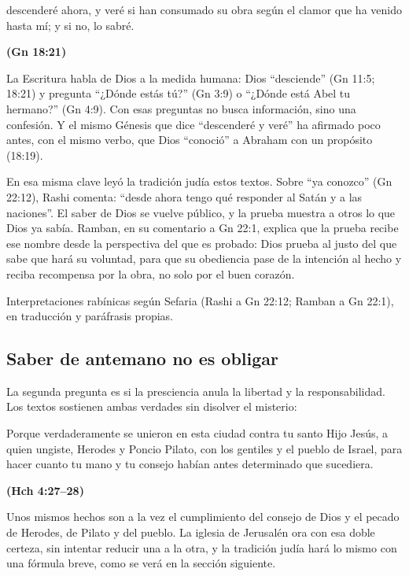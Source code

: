 \documentclass[11pt,letterpaper]{article}
\newcommand{\fuente}[1]{\par\hfill{\upshape\bfseries\small\textcolor{azul}{#1}}}
\begin{document}
\begin{cita}descenderé ahora, y veré si han consumado su obra según el clamor que ha venido hasta mí; y si no, lo sabré.\fuente{(Gn 18:21)}\end{cita}

La Escritura habla de Dios a la medida humana: Dios ``desciende'' (Gn 11:5; 18:21) y pregunta ``¿Dónde estás tú?'' (Gn 3:9) o ``¿Dónde está Abel tu hermano?'' (Gn 4:9). Con esas preguntas no busca información, sino una confesión. Y el mismo Génesis que dice ``descenderé y veré'' ha afirmado poco antes, con el mismo verbo, que Dios ``conoció'' a Abraham con un propósito (18:19).

En esa misma clave leyó la tradición judía estos textos. Sobre ``ya conozco'' (Gn 22:12), Rashi comenta: ``desde ahora tengo qué responder al Satán y a las naciones''. El saber de Dios se vuelve público, y la prueba muestra a otros lo que Dios ya sabía. Ramban, en su comentario a Gn 22:1, explica que la prueba recibe ese nombre desde la perspectiva del que es probado: Dios prueba al justo del que sabe que hará su voluntad, para que su obediencia pase de la intención al hecho y reciba recompensa por la obra, no solo por el buen corazón.

\begin{nota}[Precisión]
Interpretaciones rabínicas según Sefaria (Rashi a Gn 22:12; Ramban a Gn 22:1), en traducción y paráfrasis propias.
\end{nota}

\subsection{Saber de antemano no es obligar}
La segunda pregunta es si la presciencia anula la libertad y la responsabilidad. Los textos sostienen ambas verdades sin disolver el misterio:

\begin{cita}Porque verdaderamente se unieron en esta ciudad contra tu santo Hijo Jesús, a quien ungiste, Herodes y Poncio Pilato, con los gentiles y el pueblo de Israel, para hacer cuanto tu mano y tu consejo habían antes determinado que sucediera.\fuente{(Hch 4:27--28)}\end{cita}

Unos mismos hechos son a la vez el cumplimiento del consejo de Dios y el pecado de Herodes, de Pilato y del pueblo. La iglesia de Jerusalén ora con esa doble certeza, sin intentar reducir una a la otra, y la tradición judía hará lo mismo con una fórmula breve, como se verá en la sección siguiente.
\end{document}
